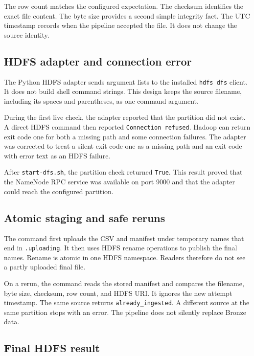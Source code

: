 \documentclass[11pt,a4paper]{article}
\begin{document}
The row count matches the configured expectation. The checksum identifies the exact file content. The byte size provides a second simple integrity fact. The UTC timestamp records when the pipeline accepted the file. It does not change the source identity.

\subsection{HDFS adapter and connection error}

The Python HDFS adapter sends argument lists to the installed \texttt{hdfs dfs} client. It does not build shell command strings. This design keeps the source filename, including its spaces and parentheses, as one command argument.

During the first live check, the adapter reported that the partition did not exist. A direct HDFS command then reported \texttt{Connection refused}. Hadoop can return exit code one for both a missing path and some connection failures. The adapter was corrected to treat a silent exit code one as a missing path and an exit code with error text as an HDFS failure.

After \texttt{start-dfs.sh}, the partition check returned \texttt{True}. This result proved that the NameNode RPC service was available on port 9000 and that the adapter could reach the configured partition.

\subsection{Atomic staging and safe reruns}

The command first uploads the CSV and manifest under temporary names that end in \texttt{.uploading}. It then uses HDFS rename operations to publish the final names. Rename is atomic in one HDFS namespace. Readers therefore do not see a partly uploaded final file.

On a rerun, the command reads the stored manifest and compares the filename, byte size, checksum, row count, and HDFS URI. It ignores the new attempt timestamp. The same source returns \texttt{already\_ingested}. A different source at the same partition stops with an error. The pipeline does not silently replace Bronze data.

\subsection{Final HDFS result}
\end{document}
